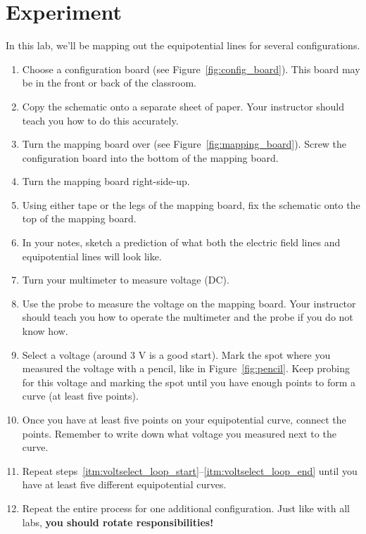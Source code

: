 \documentclass[12pt]{article}
\begin{document}
\section*{Experiment}
In this lab, we'll be mapping out the equipotential lines for several configurations.
\begin{enumerate}
	\item{Choose a configuration board (see Figure~\ref{fig:config_board}). This board may be in the front or back of the classroom.}
	\item{Copy the schematic onto a separate sheet of paper. Your instructor should teach you how to do this accurately.}
	\item{Turn the mapping board over (see Figure~\ref{fig:mapping_board}). Screw the configuration board into the bottom of the mapping board.}
	\item{Turn the mapping board right-side-up.}
	\item{Using either tape or the legs of the mapping board, fix the schematic onto the top of the mapping board.}
	\item{In your notes, sketch a prediction of what both the electric field lines and equipotential lines will look like.}
	\item{Turn your multimeter to measure voltage (DC).}
	\item{Use the probe to measure the voltage on the mapping board. Your instructor should teach you how to operate the multimeter and the probe if you do not know how.}
	\item{Select a voltage (around 3 V is a good start). Mark the spot where you measured the voltage with a pencil, like in Figure~\ref{fig:pencil}. Keep probing for this voltage and marking the spot until you have enough points to form a curve (at least five points).\label{itm:voltselect_loop_start}}
	\item{Once you have at least five points on your equipotential curve, connect the points. Remember to write down what voltage you measured next to the curve.\label{itm:voltselect_loop_end}}
	\item{Repeat steps~\ref{itm:voltselect_loop_start}--\ref{itm:voltselect_loop_end} until you have at least five different equipotential curves.}
	\item{Repeat the entire process for one additional configuration. Just like with all labs, \textbf{you should rotate responsibilities!}}
\end{enumerate}
\end{document}
